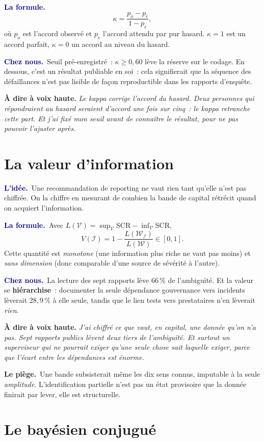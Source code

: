 \documentclass[11pt,a4paper]{article}
\newcommand{\lidee}[1]{\smallskip\noindent\textcolor{navy}{\textbf{L'idée.}}\ #1\par}
\newcommand{\laformule}[1]{\smallskip\noindent\textcolor{navy}{\textbf{La formule.}}\ #1\par}
\newcommand{\cheznous}[1]{\smallskip\noindent\textcolor{navy}{\textbf{Chez nous.}}\ #1\par}
\newcommand{\lepiege}[1]{\smallskip\noindent\textcolor{accent}{\textbf{Le piège.}}\ #1\par}
\newcommand{\laphrase}[1]{\begin{phrasebox}\textbf{À dire à voix haute.} \emph{#1}\end{phrasebox}}
\begin{document}
\laformule{
\[
  \kappa = \frac{p_o - p_e}{1 - p_e},
\]
où $p_o$ est l'accord observé et $p_e$ l'accord attendu par pur hasard. $\kappa=1$ est un
accord parfait, $\kappa=0$ un accord au niveau du hasard.}

\cheznous{Seuil pré-enregistré~: $\kappa\ge0{,}60$ lève la réserve sur le codage. En dessous,
c'est un résultat publiable en soi~: cela signifierait que la séquence des défaillances
n'est pas lisible de façon reproductible dans les rapports d'enquête.}

\laphrase{Le kappa corrige l'accord du hasard. Deux personnes qui répondraient au hasard
seraient d'accord une fois sur cinq~: le kappa retranche cette part. Et j'ai fixé mon seuil
\emph{avant} de connaître le résultat, pour ne pas pouvoir l'ajuster après.}

\section{La valeur d'information}

\lidee{Une recommandation de reporting ne vaut rien tant qu'elle n'est pas chiffrée. On la
chiffre en mesurant de combien la bande de capital rétrécit quand on acquiert
l'information.}

\laformule{Avec $L(\mathcal{V})=\sup_{\mathcal{V}}\mathrm{SCR}-\inf_{\mathcal{V}}\mathrm{SCR}$,
\[
  V(\mathcal{I}) = 1-\frac{L(\mathcal{W}_{\mathcal{I}})}{L(\mathcal{W})} \in[0,1].
\]
Cette quantité est \emph{monotone} (une information plus riche ne vaut pas moins) et
\emph{sans dimension} (donc comparable d'une source de sévérité à l'autre).}

\cheznous{La lecture des sept rapports lève $66\,\%$ de l'ambiguïté. Et la valeur se
\textbf{hiérarchise}~: documenter la seule dépendance gouvernance vers incidents lèverait
$28{,}9\,\%$ à elle seule, tandis que le lien tests vers prestataires n'en lèverait
\emph{rien}.}

\laphrase{J'ai chiffré ce que vaut, en capital, une donnée qu'on n'a pas. Sept rapports
publics lèvent deux tiers de l'ambiguïté. Et surtout un superviseur qui ne pourrait exiger
qu'une seule chose sait laquelle exiger, parce que l'écart entre les dépendances est
énorme.}

\lepiege{Une bande subsisterait même les dix sens connus, imputable à la seule
\emph{amplitude}. L'identification partielle n'est pas un état provisoire que la donnée
finirait par lever, elle est structurelle.}

\section{Le bayésien conjugué}
\end{document}
